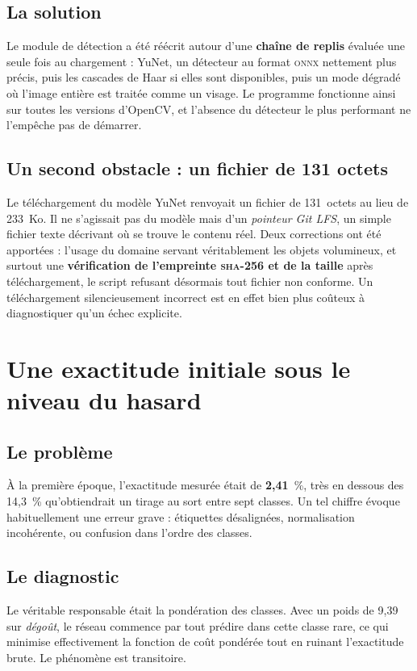 \documentclass[a4paper,12pt]{report}
\begin{document}
\subsection*{La solution}
Le module de détection a été réécrit autour d'une \textbf{chaîne de replis}
évaluée une seule fois au chargement : YuNet, un détecteur au format
\textsc{onnx} nettement plus précis, puis les cascades de Haar si elles sont
disponibles, puis un mode dégradé où l'image entière est traitée comme un
visage. Le programme fonctionne ainsi sur toutes les versions d'OpenCV, et
l'absence du détecteur le plus performant ne l'empêche pas de démarrer.

\subsection*{Un second obstacle : un fichier de 131 octets}
Le téléchargement du modèle YuNet renvoyait un fichier de 131~octets au lieu de
233~Ko. Il ne s'agissait pas du modèle mais d'un \emph{pointeur Git LFS}, un
simple fichier texte décrivant où se trouve le contenu réel. Deux corrections
ont été apportées : l'usage du domaine servant véritablement les objets
volumineux, et surtout une \textbf{vérification de l'empreinte \textsc{sha}-256
et de la taille} après téléchargement, le script refusant désormais tout fichier
non conforme. Un téléchargement silencieusement incorrect est en effet bien plus
coûteux à diagnostiquer qu'un échec explicite.

\section{Une exactitude initiale sous le niveau du hasard}

\subsection*{Le problème}
À la première époque, l'exactitude mesurée était de \textbf{2{,}41}~\%, très
en dessous des 14{,}3~\% qu'obtiendrait un tirage au sort entre sept classes.
Un tel chiffre évoque habituellement une erreur grave : étiquettes désalignées,
normalisation incohérente, ou confusion dans l'ordre des classes.

\subsection*{Le diagnostic}
Le véritable responsable était la pondération des classes. Avec un poids de
9{,}39 sur \emph{dégoût}, le réseau commence par tout prédire dans cette classe
rare, ce qui minimise effectivement la fonction de coût pondérée tout en
ruinant l'exactitude brute. Le phénomène est transitoire.
\end{document}
